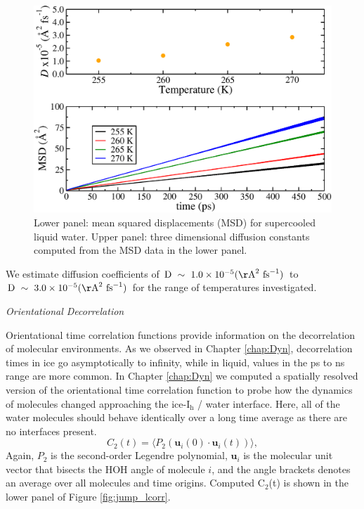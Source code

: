 \begin{figure}
\includegraphics[width=\linewidth]{Figures/bulkD}
\caption{\label{fig:bulkD} Lower panel: mean squared displacements
  (MSD) for supercooled liquid water. Upper panel: three dimensional
  diffusion constants computed from the MSD data in the lower panel. }
\end{figure}    
 
We estimate diffusion coefficients of
$\mathrm{D}~\sim~ 1.0 \times 10^{-5}
(\mathrm{\AA}^{2}~\mathrm{fs}^{-1})$ to
$\mathrm{D}~\sim~ 3.0 \times 10^{-5}
(\mathrm{\AA}^{2}~\mathrm{fs}^{-1})$ for the range of temperatures
investigated. %


\begin{flushleft}
\textit{Orientational Decorrelation}
\end{flushleft}

Orientational time correlation functions provide information on the
decorrelation of molecular environments. As we observed in Chapter
\ref{chap:Dyn}, decorrelation times in ice go asymptotically to
infinity, while in liquid, values in the ps to ns range are more
common. In Chapter \ref{chap:Dyn} we computed a spatially resolved
version of the orientational time correlation function to probe how
the dynamics of molecules changed approaching the ice-I$_\mathrm{h}$ /
water interface. Here, all of the water molecules should behave
identically over a long time average as there are no interfaces present.
\begin{equation}\label{C(t)}
  C_{2}(t)=\langle P_{2}(\mathbf{u}_i(0)\cdot \mathbf{u}_i(t))\rangle,
\end{equation}
Again, $P_2$ is the second-order Legendre polynomial, 
$\mathbf{u}_i$ is the molecular unit vector that bisects the HOH angle
of molecule $i$, and the angle brackets denotes an average over all
molecules and time origins. Computed C$_2$(t) is shown in the lower
panel of Figure \ref{fig:jump_lcorr}.

